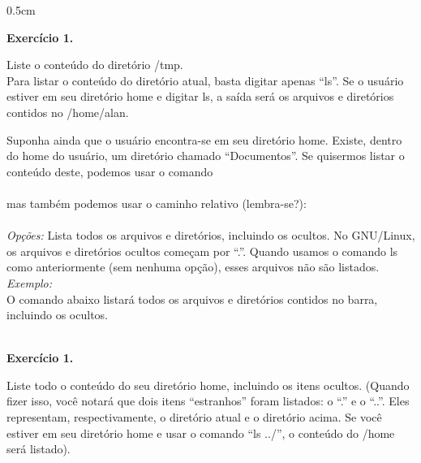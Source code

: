 \begin{refsection}
\begin {myindentpar}{0.5cm}
\begin{enumerate}[\itshape i.]
\begin{blackBlock}{\textbf{Exercício 1.}}\label{tut1:ex:1.\arabic{ex}}

Liste o conteúdo do diretório /tmp.\\
 Para listar o conteúdo do diretório atual, basta digitar apenas ``ls''. Se o usuário estiver em seu diretório home e digitar ls, a saída será os arquivos e diretórios contidos no /home/alan.\\

\end{blackBlock}

Suponha ainda que o usuário encontra-se em seu diretório home. Existe, dentro do home do usuário, um diretório chamado ``Documentos''. Se quisermos listar o conteúdo deste, podemos usar o comando\\
 \\
 mas também podemos usar o caminho relativo (lembra-se?):\\
\\
 \textit{Opções:}
         Lista todos os arquivos e diretórios, incluindo os ocultos. No GNU/Linux, os arquivos e diretórios ocultos começam por ``.''. Quando usamos o comando ls como anteriormente (sem nenhuma opção), esses arquivos não são listados.\\
 \textit{Exemplo:}\\
 O comando abaixo listará todos os arquivos e diretórios contidos no barra, incluindo os ocultos.\\
 \\

\begin{blackBlock}{\textbf{Exercício 1.}}\label{tut1:ex:1.\arabic{ex}}

Liste todo o conteúdo do seu diretório home, incluindo os itens ocultos. (Quando fizer isso, você notará que dois itens ``estranhos'' foram listados: o ``.'' e o ``..''. Eles representam, respectivamente, o diretório atual e o diretório acima. Se você estiver em seu diretório home e usar o comando ``ls ../'', o conteúdo do /home será listado).\\

\end{blackBlock}



\end{enumerate}
\end{myindentpar}
\end{refsection}
